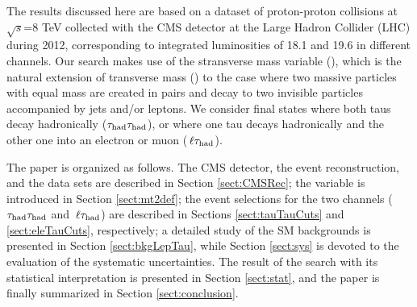 The results discussed here are based on a dataset of proton-proton 
collisions at $\sqrt{s}$=8 TeV
collected with the CMS detector at the Large Hadron Collider (LHC) during 2012, corresponding to integrated
luminosities of 18.1 and 19.6 \invfb in different channels. 
Our search makes use of the stransverse mass variable (\mttwo), 
which is the natural extension of transverse mass (\mt) to the case 
where two massive particles with equal mass are created in pairs and decay 
to two invisible particles accompanied by jets and/or leptons.  We consider final states where
both taus decay hadronically ($\tau_{\rm had} \tau_{\rm had}$), or where one tau decays hadronically and the
other one into an electron or muon ($\,\ell\tau_{\rm had}$).

The paper is organized as follows.  The CMS detector, the event reconstruction, and the data sets are described
in Section \ref{sect:CMSRec}; the \mttwo variable is introduced in Section \ref{sect:mt2def}; 
the event selections for the two channels ($\tau_{\rm had} \tau_{\rm had}$ and $\,\ell\tau_{\rm had}$)
are described in Sections \ref{sect:tauTauCuts} and \ref{sect:eleTauCuts}, respectively;
a detailed study of the SM backgrounds is presented in Section \ref{sect:bkgLepTau}, while Section \ref{sect:sys} 
is devoted to the evaluation of the systematic uncertainties.  The result of the search with its statistical interpretation is presented in 
Section \ref{sect:stat}, and the paper is finally summarized in Section \ref{sect:conclusion}.





